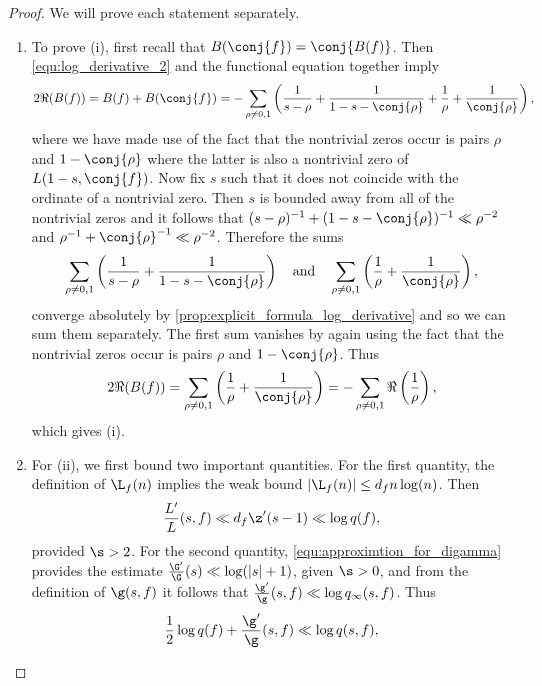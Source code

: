     \begin{proof}
      We will prove each statement separately.
      \begin{enumerate}[label=(\roman*)]
        \item To prove (i), first recall that  $B(\conj{f}) = \conj{B(f)}$. Then \cref{equ:log_derivative_2} and the functional equation together imply
        \[
          2\Re(B(f)) = B(f)+B(\conj{f}) = -\sum_{\rho \neq 0,1}\left(\frac{1}{s-\rho}+\frac{1}{1-s-\conj{\rho}}+\frac{1}{\rho}+\frac{1}{\conj{\rho}}\right),
        \]
        where we have made use of the fact that the nontrivial zeros occur is pairs $\rho$ and $1-\conj{\rho}$ where the latter is also a nontrivial zero of $L(1-s,\conj{f})$. Now fix $s$ such that it does not coincide with the ordinate of a nontrivial zero. Then $s$ is bounded away from all of the nontrivial zeros and it follows that $(s-\rho)^{-1}+(1-s-\conj{\rho})^{-1} \ll \rho^{-2}$ and $\rho^{-1}+\conj{\rho}^{-1} \ll \rho^{-2}$. Therefore the sums
        \[
          \sum_{\rho \neq 0,1}\left(\frac{1}{s-\rho}+\frac{1}{1-s-\conj{\rho}}\right) \quad \text{and} \quad \sum_{\rho \neq 0,1}\left(\frac{1}{\rho}+\frac{1}{\conj{\rho}}\right),
        \]
        converge absolutely by \cref{prop:explicit_formula_log_derivative} and so we can sum them separately. The first sum vanishes by again using the fact that the nontrivial zeros occur is pairs $\rho$ and $1-\conj{\rho}$. Thus
        \[
          2\Re(B(f)) = \sum_{\rho \neq 0,1}\left(\frac{1}{\rho}+\frac{1}{\conj{\rho}}\right) = -\sum_{\rho \neq 0,1}\Re\left(\frac{1}{\rho}\right),
        \]
        which gives (i).
        \item For (ii), we first bound two important quantities. For the first quantity, the definition of $\L_{f}(n)$ implies the weak bound $|\L_{f}(n)| \le d_{f}n\log(n)$. Then
        \begin{equation}\label{equ:log_derivative_bound_conductor}
          \frac{L'}{L}(s,f) \ll d_{f}\z'(s-1) \ll \log{q(f)},
        \end{equation}
        provided $\s > 2$. For the second quantity, \cref{equ:approximtion_for_digamma} provides the estimate $\frac{\G'}{\G}(s) \ll \log(|s|+1)$, given $\s > 0$, and from the definition of $\g(s,f)$ it follows that $\frac{\g'}{\g}(s,f) \ll \log{q_{\infty}(s,f)}$. Thus
        \begin{equation}\label{equ:log_conductor_gamma_factor_bound_analytic_conductor}
          \frac{1}{2}\log{q(f)}+\frac{\g'}{\g}(s,f) \ll \log{q(s,f)},
        \end{equation}

\end{enumerate}
\end{proof}
